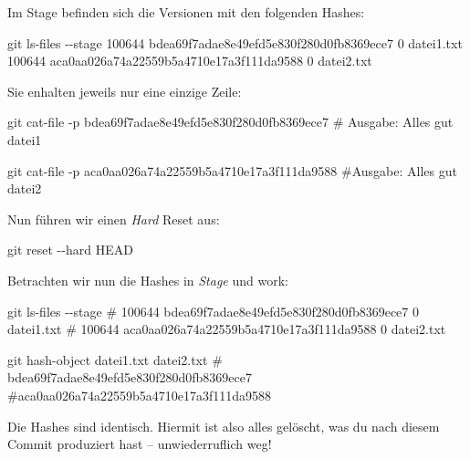 \documentclass[
  ngerman,
  letterpaper,
  DIV=11]{scrreprt}
\newenvironment{Shaded}{\begin{snugshade}}{\end{snugshade}}
\newcommand{\AttributeTok}[1]{\textcolor[rgb]{0.40,0.45,0.13}{#1}}
\newcommand{\CommentTok}[1]{\textcolor[rgb]{0.37,0.37,0.37}{#1}}
\newcommand{\ExtensionTok}[1]{\textcolor[rgb]{0.00,0.23,0.31}{#1}}
\newcommand{\FunctionTok}[1]{\textcolor[rgb]{0.28,0.35,0.67}{#1}}
\newcommand{\NormalTok}[1]{\textcolor[rgb]{0.00,0.23,0.31}{#1}}
\newcommand{\stage}{\textit{Stage}\xspace}
\begin{document}
Im Stage befinden sich die Versionen mit den folgenden Hashes:

\begin{Shaded}
\begin{Highlighting}[]
\FunctionTok{git}\NormalTok{ ls{-}files }\AttributeTok{{-}{-}stage}
\ExtensionTok{100644}\NormalTok{ bdea69f7adae8e49efd5e830f280d0fb8369ece7 0   datei1.txt}
\ExtensionTok{100644}\NormalTok{ aca0aa026a74a22559b5a4710e17a3f111da9588 0   datei2.txt}
\end{Highlighting}
\end{Shaded}

Sie enhalten jeweils nur eine einzige Zeile:

\begin{Shaded}
\begin{Highlighting}[]
\FunctionTok{git}\NormalTok{ cat{-}file }\AttributeTok{{-}p}\NormalTok{ bdea69f7adae8e49efd5e830f280d0fb8369ece7}
\CommentTok{\# Ausgabe: Alles gut datei1}

\FunctionTok{git}\NormalTok{ cat{-}file }\AttributeTok{{-}p}\NormalTok{ aca0aa026a74a22559b5a4710e17a3f111da9588}
\CommentTok{\#Ausgabe: Alles gut datei2}
\end{Highlighting}
\end{Shaded}

Nun führen wir einen \emph{Hard} Reset aus:

\begin{Shaded}
\begin{Highlighting}[]
\FunctionTok{git}\NormalTok{ reset }\AttributeTok{{-}{-}hard}\NormalTok{ HEAD }
\end{Highlighting}
\end{Shaded}

Betrachten wir nun die Hashes in \stage und work:

\begin{Shaded}
\begin{Highlighting}[]
\FunctionTok{git}\NormalTok{ ls{-}files }\AttributeTok{{-}{-}stage}
\CommentTok{\# 100644 bdea69f7adae8e49efd5e830f280d0fb8369ece7 0 datei1.txt}
\CommentTok{\# 100644 aca0aa026a74a22559b5a4710e17a3f111da9588 0 datei2.txt}

\FunctionTok{git}\NormalTok{ hash{-}object datei1.txt datei2.txt}
\CommentTok{\# bdea69f7adae8e49efd5e830f280d0fb8369ece7}
\CommentTok{\#aca0aa026a74a22559b5a4710e17a3f111da9588}
\end{Highlighting}
\end{Shaded}

Die Hashes sind identisch. Hiermit ist also alles gelöscht, was du nach
diesem Commit produziert hast -- unwiederruflich weg!
\end{document}
